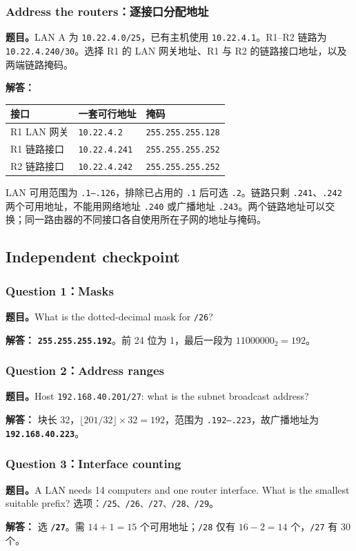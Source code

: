 \documentclass[11pt,a4paper,fontset=fandol]{ctexart}
\renewcommand{\exercisequestion}[2]{%
  \Needspace{5\baselineskip}%
  \subsubsection{#2}\label{exercise:#1}%
}
\renewenvironment{checkedsolution}
  {\par\nopagebreak[4]\textbf{解答：}\ignorespaces}
  {\par}
\begin{document}
\exercisequestion{SC2008-HW01-Q07}{Address the routers：逐接口分配地址}

\textbf{题目。}LAN A 为 \texttt{10.22.4.0/25}，已有主机使用 \texttt{10.22.4.1}。R1--R2 链路为 \texttt{10.22.4.240/30}。选择 R1 的 LAN 网关地址、R1 与 R2 的链路接口地址，以及两端链路掩码。

\begin{checkedsolution}
\begin{center}
\small
\begin{tabular}{@{}lll@{}}
\toprule
接口 & 一套可行地址 & 掩码 \\
\midrule
R1 LAN 网关 & \texttt{10.22.4.2} & \texttt{255.255.255.128} \\
R1 链路接口 & \texttt{10.22.4.241} & \texttt{255.255.255.252} \\
R2 链路接口 & \texttt{10.22.4.242} & \texttt{255.255.255.252} \\
\bottomrule
\end{tabular}
\end{center}
LAN 可用范围为 \texttt{.1--.126}，排除已占用的 \texttt{.1} 后可选 \texttt{.2}。链路只剩 \texttt{.241}、\texttt{.242} 两个可用地址，不能用网络地址 \texttt{.240} 或广播地址 \texttt{.243}。两个链路地址可以交换；同一路由器的不同接口各自使用所在子网的地址与掩码。
\end{checkedsolution}

\subsection{Independent checkpoint}

\exercisequestion{SC2008-HW01-Q08}{Question 1：Masks}
\textbf{题目。}What is the dotted-decimal mask for \texttt{/26}?
\begin{checkedsolution}
\textbf{\texttt{255.255.255.192}}。前 24 位为 1，最后一段为 $11000000_2=192$。
\end{checkedsolution}

\exercisequestion{SC2008-HW01-Q09}{Question 2：Address ranges}
\textbf{题目。}Host \texttt{192.168.40.201/27}: what is the subnet broadcast address?
\begin{checkedsolution}
块长 32，$\lfloor201/32\rfloor\times32=192$，范围为 \texttt{.192--.223}，故广播地址为 \textbf{\texttt{192.168.40.223}}。
\end{checkedsolution}

\exercisequestion{SC2008-HW01-Q10}{Question 3：Interface counting}
\textbf{题目。}A LAN needs 14 computers and one router interface. What is the smallest suitable prefix? 选项：\texttt{/25、/26、/27、/28、/29}。
\begin{checkedsolution}
选 \textbf{\texttt{/27}}。需 $14+1=15$ 个可用地址；\texttt{/28} 仅有 $16-2=14$ 个，\texttt{/27} 有 30 个。
\end{checkedsolution}
\end{document}
